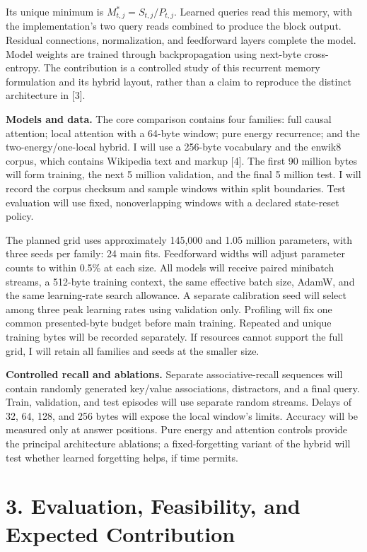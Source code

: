\documentclass[11pt,letterpaper]{article}
\begin{document}
Its unique minimum is \(M_{t,j}^{*}=S_{t,j}/P_{t,j}\). Learned queries read this memory, with the implementation's two query reads combined to produce the block output. Residual connections, normalization, and feedforward layers complete the model. Model weights are trained through backpropagation using next-byte cross-entropy. The contribution is a controlled study of this recurrent memory formulation and its hybrid layout, rather than a claim to reproduce the distinct architecture in [3].

\textbf{Models and data.} The core comparison contains four families: full causal attention; local attention with a 64-byte window; pure energy recurrence; and the two-energy/one-local hybrid. I will use a 256-byte vocabulary and the enwik8 corpus, which contains Wikipedia text and markup [4]. The first 90 million bytes will form training, the next 5 million validation, and the final 5 million test. I will record the corpus checksum and sample windows within split boundaries. Test evaluation will use fixed, nonoverlapping windows with a declared state-reset policy.

The planned grid uses approximately 145,000 and 1.05 million parameters, with three seeds per family: 24 main fits. Feedforward widths will adjust parameter counts to within 0.5\% at each size. All models will receive paired minibatch streams, a 512-byte training context, the same effective batch size, AdamW, and the same learning-rate search allowance. A separate calibration seed will select among three peak learning rates using validation only. Profiling will fix one common presented-byte budget before main training. Repeated and unique training bytes will be recorded separately. If resources cannot support the full grid, I will retain all families and seeds at the smaller size.

\textbf{Controlled recall and ablations.} Separate associative-recall sequences will contain randomly generated key/value associations, distractors, and a final query. Train, validation, and test episodes will use separate random streams. Delays of 32, 64, 128, and 256 bytes will expose the local window's limits. Accuracy will be measured only at answer positions. Pure energy and attention controls provide the principal architecture ablations; a fixed-forgetting variant of the hybrid will test whether learned forgetting helps, if time permits.

\newpage
\section*{3. Evaluation, Feasibility, and Expected Contribution}
\end{document}
